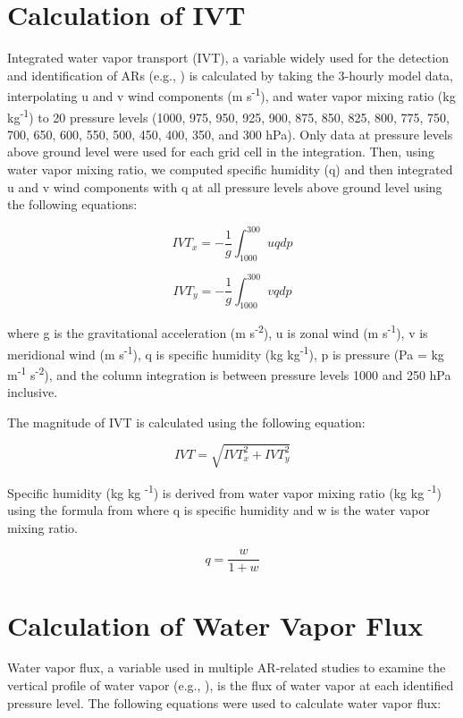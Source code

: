 \documentclass[draft]{agujournal2019}
\begin{document}
\section{Calculation of IVT}    %
\label{appendix:ivt}
Integrated water vapor transport (IVT), a variable widely used for the detection and identification of ARs (e.g., ) is calculated by taking the 3-hourly model data, interpolating u and v wind components (m s\textsuperscript{-1}), and water vapor mixing ratio (kg kg\textsuperscript{-1}) to 20 pressure levels (1000, 975, 950, 925, 900, 875, 850, 825, 800, 775, 750, 700, 650, 600, 550, 500, 450, 400, 350, and 300 hPa). Only data at pressure levels above ground level were used for each grid cell in the integration. Then, using water vapor mixing ratio, we computed specific humidity (q) and then integrated u and v wind components with q at all pressure levels above ground level using the following equations:

\begin{equation}
IVT_{x} = -\frac{1}{g} \int_{1000}^{300} u q dp
\end{equation}

\begin{equation}
IVT_{y} = -\frac{1}{g} \int_{1000}^{300} v q dp
\end{equation}

where g is the gravitational acceleration (m s\textsuperscript{-2}), u is zonal wind (m s\textsuperscript{-1}), v is meridional wind (m s\textsuperscript{-1}), q is specific humidity (kg kg\textsuperscript{-1}), p is pressure (Pa = kg m\textsuperscript{-1} s\textsuperscript{-2}), and the column integration is between pressure levels 1000 and 250 hPa inclusive.

The magnitude of IVT is calculated using the following equation:

\begin{equation}
IVT = \sqrt{IVT_{x}^2 + IVT_{y}^2}
\end{equation}

Specific humidity (kg kg \textsuperscript{-1}) is derived from water vapor mixing ratio (kg kg \textsuperscript{-1}) using the formula from \cite{Wallace2006} where q is specific humidity and w is the water vapor mixing ratio.

\begin{equation}
q = \frac{w}{1 + w}
\end{equation}

\section{Calculation of Water Vapor Flux}    %
\label{appendix:wvf}
Water vapor flux, a variable used in multiple AR-related studies to examine the vertical profile of water vapor (e.g., ), is the flux of water vapor at each identified pressure level. The following equations were used to calculate water vapor flux: 
\end{document}
